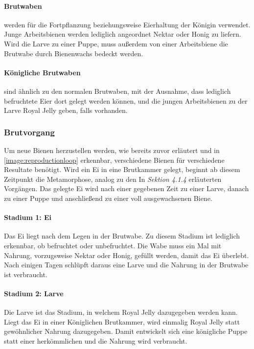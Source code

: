 \paragraph{Brutwaben} werden für die Fortpflanzung beziehungsweise Eierhaltung der Königin verwendet. Junge Arbeitsbienen werden lediglich angeordnet Nektar oder Honig zu liefern. Wird die Larve zu einer Puppe, muss außerdem von einer Arbeitsbiene die Brutwabe durch Bienenwachs bedeckt werden.

\paragraph{Königliche Brutwaben} sind ähnlich zu den normalen Brutwaben, mit der Ausnahme, dass lediglich befruchtete Eier dort gelegt werden können, und die jungen Arbeitsbienen zu der Larve Royal Jelly geben, falls vorhanden.

\subsubsection{Brutvorgang}
Um neue Bienen herzustellen werden, wie bereits zuvor erläutert und in \autoref{image:reproductionloop} erkennbar, verschiedene Bienen für verschiedene Resultate benötigt. Wird ein Ei in eine Brutkammer gelegt, beginnt ab diesem Zeitpunkt die Metamorphose, analog zu den In \textit{Sektion 4.1.4} erläuterten Vorgängen. Das gelegte Ei wird nach einer gegebenen Zeit zu einer Larve, danach zu einer Puppe und anschließend zu einer voll ausgewachsenen Biene.

\paragraph{Stadium 1: Ei} Das Ei liegt nach dem Legen in der Brutwabe. Zu diesem Stadium ist lediglich erkennbar, ob befruchtet oder unbefruchtet. Die Wabe muss ein Mal mit Nahrung, vorzugsweise Nektar oder Honig, gefüllt werden, damit das Ei überlebt. Nach einigen Tagen schlüpft daraus eine Larve und die Nahrung in der Brutwabe ist verbraucht.

\paragraph{Stadium 2: Larve} Die Larve ist das Stadium, in welchem Royal Jelly dazugegeben werden kann. Liegt das Ei in einer Königlichen Brutkammer, wird einmalig Royal Jelly statt gewöhnlicher Nahrung dazugegeben. Damit entwickelt sich eine königliche Puppe statt einer herkömmlichen und die Nahrung wird verbraucht.

